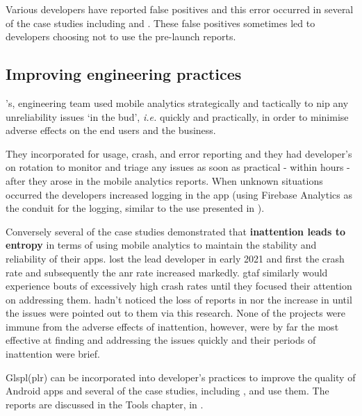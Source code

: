 Various developers have reported false positives  and this error occurred in several of the case studies including  and . These false positives sometimes led to developers choosing not to use the pre-launch reports.

\subsection{Improving engineering practices}
's, engineering team used mobile analytics strategically and tactically to nip any unreliability issues `in the bud', \emph{i.e.} quickly and practically, in order to minimise adverse effects on the end users and the business. 

They incorporated  for usage, crash, and  error reporting and they had developer's on rotation to monitor and triage any issues as soon as practical - within hours - after they arose in the mobile analytics reports. When unknown situations occurred the developers increased logging in the app (using Firebase Analytics as the conduit for the logging, similar to the use presented in ).


Conversely several of the case studies demonstrated that \textbf{inattention leads to entropy} in terms of using mobile analytics to maintain the stability and reliability of their apps.  lost the lead developer in early 2021 and first the crash rate and subsequently the \Gls{anr} rate increased markedly. \Gls{gtaf} similarly would experience bouts of excessively high crash rates until they focused their attention on addressing them.  hadn't noticed the loss of reports in  nor the increase in  until the issues were pointed out to them via this research. None of the projects were immune from the adverse effects of inattention, however,  were by far the most effective at finding and addressing the issues quickly and their periods of inattention were brief.

Glspl(plr) can be incorporated into developer's practices to improve the quality of Android apps and several of the case studies, including ,  and  use them. The reports are discussed in the Tools chapter, in .


